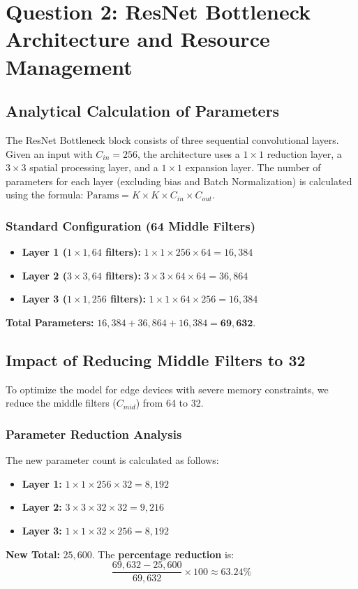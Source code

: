 \documentclass{article}
\begin{document}
\newpage
\section{Question 2: ResNet Bottleneck Architecture and Resource Management}

\subsection{Analytical Calculation of Parameters}
The ResNet Bottleneck block consists of three sequential convolutional layers. Given an input with $C_{in}=256$, the architecture uses a $1 \times 1$ reduction layer, a $3 \times 3$ spatial processing layer, and a $1 \times 1$ expansion layer. The number of parameters for each layer (excluding bias and Batch Normalization) is calculated using the formula: $\text{Params} = K \times K \times C_{in} \times C_{out}$.

\subsubsection*{Standard Configuration (64 Middle Filters)}
\begin{itemize}
	\item \textbf{Layer 1 ($1 \times 1, 64$ filters):} $1 \times 1 \times 256 \times 64 = 16,384$
	\item \textbf{Layer 2 ($3 \times 3, 64$ filters):} $3 \times 3 \times 64 \times 64 = 36,864$
	\item \textbf{Layer 3 ($1 \times 1, 256$ filters):} $1 \times 1 \times 64 \times 256 = 16,384$
\end{itemize}
\textbf{Total Parameters:} $16,384 + 36,864 + 16,384 = \mathbf{69,632}$.

\subsection*{Impact of Reducing Middle Filters to 32}
To optimize the model for edge devices with severe memory constraints, we reduce the middle filters ($C_{mid}$) from 64 to 32.

\subsubsection*{Parameter Reduction Analysis}
The new parameter count is calculated as follows:
\begin{itemize}
	\item \textbf{Layer 1:} $1 \times 1 \times 256 \times 32 = 8,192$
	\item \textbf{Layer 2:} $3 \times 3 \times 32 \times 32 = 9,216$
	\item \textbf{Layer 3:} $1 \times 1 \times 32 \times 256 = 8,192$
\end{itemize}
\textbf{New Total:} $25,600$. 
The \textbf{percentage reduction} is:
\[ \frac{69,632 - 25,600}{69,632} \times 100 \approx \mathbf{63.24\%} \]
\end{document}
